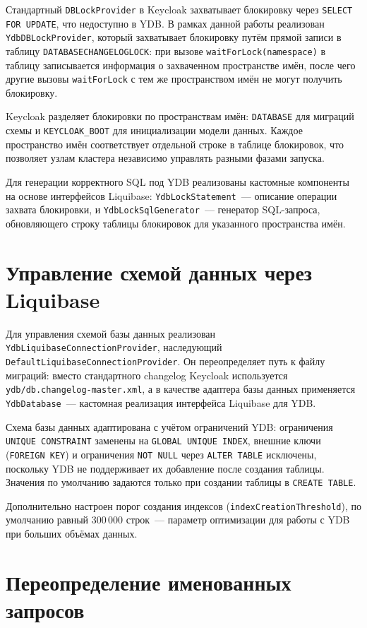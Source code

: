 \documentclass[times]{itmo-student-thesis}
\begin{document}
Стандартный \texttt{DBLockProvider} в Keycloak захватывает блокировку через
\texttt{SELECT FOR UPDATE}, что недоступно в YDB.
В рамках данной работы реализован \texttt{YdbDBLockProvider}, который захватывает
блокировку путём прямой записи в таблицу \texttt{DATABASECHANGELOGLOCK}:
при вызове \texttt{waitForLock(namespace)} в таблицу записывается информация
о захваченном пространстве имён, после чего другие вызовы \texttt{waitForLock}
с тем же пространством имён не могут получить блокировку.

Keycloak разделяет блокировки по пространствам имён: \texttt{DATABASE} для миграций
схемы и \texttt{KEYCLOAK\_BOOT} для инициализации модели данных.
Каждое пространство имён соответствует отдельной строке в таблице блокировок,
что позволяет узлам кластера независимо управлять разными фазами запуска.

Для генерации корректного SQL под YDB реализованы кастомные компоненты
на основе интерфейсов Liquibase: \texttt{YdbLockStatement}~--- описание операции
захвата блокировки, и \texttt{YdbLockSqlGenerator}~--- генератор SQL-запроса,
обновляющего строку таблицы блокировок для указанного пространства имён.

\section{Управление схемой данных через Liquibase}

Для управления схемой базы данных реализован \texttt{YdbLiquibaseConnectionProvider},
наследующий \texttt{DefaultLiquibaseConnectionProvider}.
Он переопределяет путь к файлу миграций: вместо стандартного changelog Keycloak
используется \texttt{ydb/db.changelog-master.xml}, а в качестве адаптера базы данных
применяется \texttt{YdbDatabase}~--- кастомная реализация интерфейса Liquibase для YDB.

Схема базы данных адаптирована с учётом ограничений YDB:
ограничения \texttt{UNIQUE CONSTRAINT} заменены на \texttt{GLOBAL UNIQUE INDEX},
внешние ключи (\texttt{FOREIGN KEY}) и ограничения \texttt{NOT NULL} через
\texttt{ALTER TABLE} исключены, поскольку YDB не поддерживает их добавление
после создания таблицы.
Значения по умолчанию задаются только при создании таблицы в \texttt{CREATE TABLE}.

Дополнительно настроен порог создания индексов (\texttt{indexCreationThreshold}),
по умолчанию равный 300\,000 строк~--- параметр оптимизации для работы с YDB
при больших объёмах данных.

\section{Переопределение именованных запросов}
\end{document}
